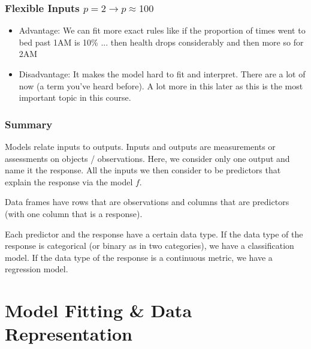 \documentclass[slides]{beamer} %
\begin{document}
\begin{frame}\frametitle{Flexible Inputs $p=2 \rightarrow p \approx 100$}

\begin{itemize}
\item Advantage: We can fit more exact rules like if the proportion of times went to bed past 1AM is 10\% ... then health drops considerably and then more so for 2AM
\item Disadvantage: It makes the model hard to fit and interpret. There are a lot of  now (a term you've heard before). A lot more in this later as this is the most important topic in this course.
\end{itemize}

\end{frame}

\begin{frame}\frametitle{Summary}

Models relate inputs to outputs. Inputs and outputs are measurements or assessments on objects / observations.  Here, we consider only one output and name it the response. All the inputs we then consider to be predictors that explain the response via the model $f$. 

Data frames have rows that are observations and columns that are predictors (with one column that is a response). 

Each predictor and the response have a certain data type. If the data type of the response is categorical (or binary as in two categories), we have a classification model. If the data type of the response is a continuous metric, we have a regression model.
	
\end{frame}

\section{Model Fitting \& Data Representation}
\end{document}
